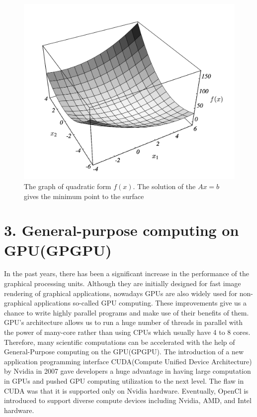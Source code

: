 \documentclass[times]{TRR}
\begin{document}
\begin{figure}[h]
    \includegraphics[scale=0.4]{images/quadratic-form-graph.png}
    \caption{The graph of quadratic form $f(x)$. The solution of the $Ax = b$ gives the minimum point to the surface}
\end{figure}
\section{3. General-purpose computing on GPU(GPGPU)} 
\noindent
In the past years, there has been a significant increase in the performance of the graphical processing units. Although they are initially designed for fast image rendering of graphical applications, nowadays GPUs are also widely used for non-graphical applications so-called GPU computing. These improvements give us a chance to write highly parallel programs and make use of their benefits of them. GPU's architecture allows us to run a huge number of threads in parallel with the power of many-core rather than using CPUs which usually have 4 to 8 cores. Therefore, many scientific computations can be accelerated with the help of General-Purpose computing on the GPU(GPGPU). The introduction of a new application programming interface CUDA(Compute Unified Device Architecture) by Nvidia in 2007 gave developers a huge advantage in having large computation in GPUs and pushed GPU computing utilization to the next level. The flaw in CUDA was that it is supported only on Nvidia hardware. Eventually, OpenCl is introduced to support diverse compute devices including Nvidia, AMD, and Intel hardware.
\end{document}
